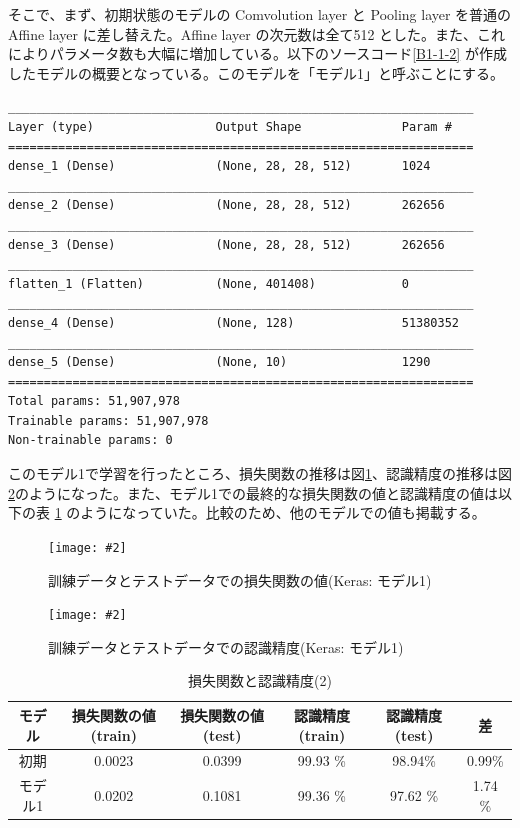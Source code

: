 \documentclass[a4paper,dvipdfmx]{jsarticle}
\newcommand{\image}[3]{
    \begin{figure}[H]
        \begin{center}
        \texttt{[image: \#2]}
        \end{center}
        \caption{#1}
        \label{#3}
    \end{figure}
}
\begin{document}
そこで、まず、初期状態のモデルの Comvolution layer と Pooling layer を普通の Affine layer に差し替えた。Affine layer の次元数は全て512 とした。また、これによりパラメータ数も大幅に増加している。以下のソースコード\ref{B1-1-2} が作成したモデルの概要となっている。このモデルを「モデル1」と呼ぶことにする。

\begin{lstlisting}[caption="作成したモデル 1",label=B1-1-2]
_________________________________________________________________
Layer (type)                 Output Shape              Param #
=================================================================
dense_1 (Dense)              (None, 28, 28, 512)       1024
_________________________________________________________________
dense_2 (Dense)              (None, 28, 28, 512)       262656
_________________________________________________________________
dense_3 (Dense)              (None, 28, 28, 512)       262656
_________________________________________________________________
flatten_1 (Flatten)          (None, 401408)            0
_________________________________________________________________
dense_4 (Dense)              (None, 128)               51380352
_________________________________________________________________
dense_5 (Dense)              (None, 10)                1290
=================================================================
Total params: 51,907,978
Trainable params: 51,907,978
Non-trainable params: 0
\end{lstlisting}

このモデル1で学習を行ったところ、損失関数の推移は図\ref{fig-B1-1-3}、認識精度の推移は図\ref{fig-B1-1-4}のようになった。また、モデル1での最終的な損失関数の値と認識精度の値は以下の表 \ref{tableB1-2} のようになっていた。比較のため、他のモデルでの値も掲載する。

\image{訓練データとテストデータでの損失関数の値(Keras: モデル1)}{report_b1-1-3.png}{fig-B1-1-3}
\image{訓練データとテストデータでの認識精度(Keras: モデル1)}{report_b1-1-4.png}{fig-B1-1-4}

\begin{table}[H]
\begin{center}
\caption{損失関数と認識精度(2)}
  \begin{tabular}{|c|c|c||c|c|c|} \hline
    モデル & 損失関数の値(train) & 損失関数の値(test) & 認識精度(train) & 認識精度(test) & 差 \\ \hline \hline
    初期 & 0.0023 & 0.0399 & 99.93 \% & 98.94\% & 0.99\% \\ \hline
    モデル1 & 0.0202 & 0.1081 & 99.36 \% & 97.62 \% & 1.74 \% \\ \hline 
  \end{tabular}
	\label{tableB1-2}
\end{center}
\end{table}
\end{document}
